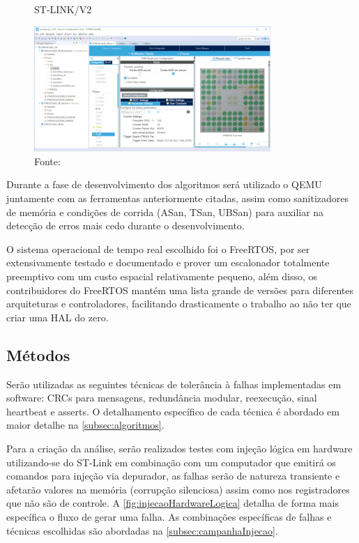 \begin{figure}[H]
    \centering
    \captionsetup{justification=centering}
    \caption{ST-LINK/V2}
    \includegraphics[width=0.80\textwidth]{assets/stmcube_ide.png}
    \captionsetup{justification=raggedright}
    \caption*{Fonte: }
    \label{fig:stmCubeIDE}
\end{figure}

Durante a fase de desenvolvimento dos algoritmos será utilizado o QEMU juntamente com as ferramentas anteriormente citadas, assim como sanitizadores de memória e condições de corrida (ASan, TSan, UBSan) para auxiliar na detecção de erros mais cedo durante o desenvolvimento.

O sistema operacional de tempo real escolhido foi o FreeRTOS, por ser extensivamente testado e documentado e prover um escalonador totalmente preemptivo com um custo espacial relativamente pequeno, além disso, os contribuidores do FreeRTOS mantém uma lista grande de versões para diferentes arquiteturas e controladores, facilitando drasticamente o trabalho ao não ter que criar uma HAL do zero.

\subsection{Métodos}

Serão utilizadas as seguintes técnicas de tolerância à falhas implementadas em software: CRCs para mensagens, redundância modular, reexecução, sinal heartbeat e asserts. O detalhamento específico de cada técnica é abordado em maior detalhe na \autoref{subsec:algoritmos}.

Para a criação da análise, serão realizados testes com injeção lógica em hardware utilizando-se do ST-Link em combinação com um computador que emitirá os comandos para injeção via depurador, as falhas serão de natureza transiente e afetarão valores na memória (corrupção silenciosa) assim como nos registradores que não são de controle. A \autoref{fig:injecaoHardwareLogica} detalha de forma mais específica o fluxo de gerar uma falha. As combinações específicas de falhas e técnicas escolhidas são abordadas na \autoref{subsec:campanhaInjecao}.

